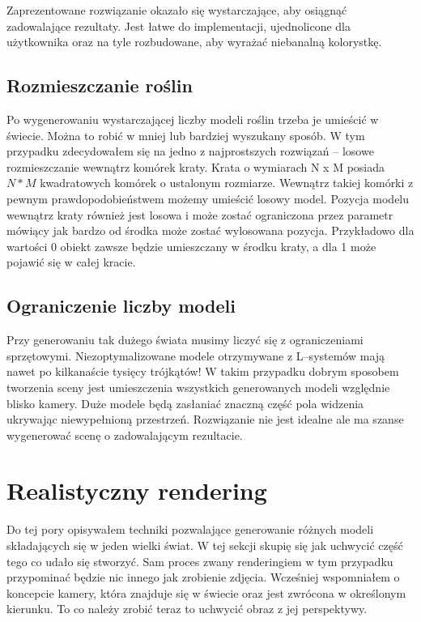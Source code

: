 \documentclass[inz,longabstract]{iithesis}
\begin{document}
        Zaprezentowane rozwiązanie okazało się wystarczające, aby osiągnąć zadowalające rezultaty. Jest łatwe do implementacji, ujednolicone dla użytkownika oraz na tyle rozbudowane, aby wyrażać niebanalną kolorystkę.
        
    \section{Rozmieszczanie roślin}
        Po wygenerowaniu wystarczającej liczby modeli roślin trzeba je umieścić w świecie. Można to robić w mniej lub bardziej wyszukany sposób. W tym przypadku zdecydowałem się na jedno z najprostszych rozwiązań -- losowe rozmieszczanie wewnątrz komórek kraty. Krata o wymiarach N x M posiada $N * M$ kwadratowych komórek o ustalonym rozmiarze. Wewnątrz takiej komórki z pewnym prawdopodobieństwem możemy umieścić losowy model. Pozycja modelu wewnątrz kraty również jest losowa i może zostać ograniczona przez parametr mówiący jak bardzo od środka może zostać wylosowana pozycja. Przykładowo dla wartości 0 obiekt zawsze będzie umieszczany w środku kraty, a dla 1 może pojawić się w całej kracie. 
        
    \section{Ograniczenie liczby modeli}
        Przy generowaniu tak dużego świata musimy liczyć się z ograniczeniami sprzętowymi. Niezoptymalizowane modele otrzymywane z L--systemów mają nawet po kilkanaście tysięcy trójkątów! W takim przypadku dobrym sposobem tworzenia sceny jest umieszczenia wszystkich generowanych modeli względnie blisko kamery. Duże modele będą zasłaniać znaczną część pola widzenia ukrywając niewypełnioną przestrzeń. Rozwiązanie nie jest idealne ale ma szanse wygenerować scenę o zadowalającym rezultacie.
        
\chapter{Realistyczny rendering}
    Do tej pory opisywałem techniki pozwalające generowanie różnych modeli składających się w jeden wielki świat. W tej sekcji skupię się jak uchwycić część tego co udało się stworzyć. Sam proces zwany renderingiem w tym przypadku przypominać będzie nic innego jak zrobienie zdjęcia. Wcześniej wspomniałem o koncepcie kamery, która znajduje się w świecie oraz jest zwrócona w określonym kierunku. To co należy zrobić teraz to uchwycić obraz z jej perspektywy. 
    
\end{document}
